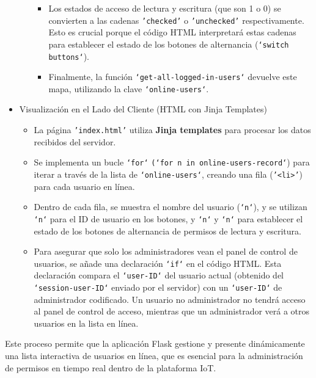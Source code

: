 \documentclass{report}
\begin{document}
\begin{itemize}
\begin{itemize}
\begin{itemize}
\begin{itemize}
                        \end{itemize}
                    \item Los estados de acceso de lectura y escritura (que son 1 o 0) se convierten a las cadenas \texttt{'checked'} o \texttt{'unchecked'} 
                    respectivamente. Esto es crucial porque el código HTML interpretará estas cadenas para establecer el estado de los botones de alternancia 
                    (\texttt{`switch buttons`}).
                    \item Finalmente, la función \texttt{`get-all-logged-in-users`} devuelve este mapa, utilizando la clave \texttt{`online-users`}.
                \end{itemize} 
        \end{itemize}

    \item Visualización en el Lado del Cliente (HTML con Jinja Templates)
        \begin{itemize}
            \item La página \texttt{'index.html'} utiliza \textbf{Jinja templates} para procesar los datos recibidos del servidor.
            \item Se implementa un bucle \texttt{`for`} \texttt{(`for n in online-users-record`}) para iterar a través de la lista de \texttt{`online-users`}, 
            creando una fila (\texttt{'<li>'}) para cada usuario en línea.
            \item Dentro de cada fila, se muestra el nombre del usuario (\texttt{`n`}), y se utilizan \texttt{`n`} para el ID de usuario en los botones, y 
            \texttt{`n`} y \texttt{`n`} para establecer el estado de los botones de alternancia de permisos de lectura y escritura.
            \item Para asegurar que solo los administradores vean el panel de control de usuarios, se añade una declaración \texttt{`if`} en el código 
            HTML. Esta declaración compara el \texttt{`user-ID`} del usuario actual (obtenido del \texttt{`session-user-ID`} enviado por el servidor) con un 
            \texttt{`user-ID`} de administrador codificado. Un usuario no administrador no tendrá acceso al panel de control de acceso, mientras que un 
            administrador verá a otros usuarios en la lista en línea.
        \end{itemize}
\end{itemize}

Este proceso permite que la aplicación Flask gestione y presente dinámicamente una lista interactiva de usuarios en línea, que es esencial para la 
administración de permisos en tiempo real dentro de la plataforma IoT.
\end{document}
